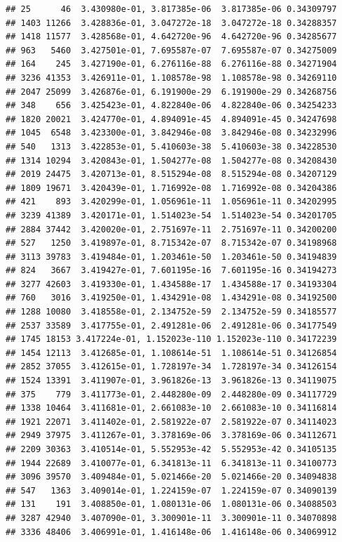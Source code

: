 \documentclass[
]{article}
\begin{document}
\begin{verbatim}
## 25      46  3.430980e-01, 3.817385e-06  3.817385e-06 0.34309797
## 1403 11266  3.428836e-01, 3.047272e-18  3.047272e-18 0.34288357
## 1418 11577  3.428568e-01, 4.642720e-96  4.642720e-96 0.34285677
## 963   5460  3.427501e-01, 7.695587e-07  7.695587e-07 0.34275009
## 164    245  3.427190e-01, 6.276116e-88  6.276116e-88 0.34271904
## 3236 41353  3.426911e-01, 1.108578e-98  1.108578e-98 0.34269110
## 2047 25099  3.426876e-01, 6.191900e-29  6.191900e-29 0.34268756
## 348    656  3.425423e-01, 4.822840e-06  4.822840e-06 0.34254233
## 1820 20021  3.424770e-01, 4.894091e-45  4.894091e-45 0.34247698
## 1045  6548  3.423300e-01, 3.842946e-08  3.842946e-08 0.34232996
## 540   1313  3.422853e-01, 5.410603e-38  5.410603e-38 0.34228530
## 1314 10294  3.420843e-01, 1.504277e-08  1.504277e-08 0.34208430
## 2019 24475  3.420713e-01, 8.515294e-08  8.515294e-08 0.34207129
## 1809 19671  3.420439e-01, 1.716992e-08  1.716992e-08 0.34204386
## 421    893  3.420299e-01, 1.056961e-11  1.056961e-11 0.34202995
## 3239 41389  3.420171e-01, 1.514023e-54  1.514023e-54 0.34201705
## 2884 37442  3.420020e-01, 2.751697e-11  2.751697e-11 0.34200200
## 527   1250  3.419897e-01, 8.715342e-07  8.715342e-07 0.34198968
## 3113 39783  3.419484e-01, 1.203461e-50  1.203461e-50 0.34194839
## 824   3667  3.419427e-01, 7.601195e-16  7.601195e-16 0.34194273
## 3277 42603  3.419330e-01, 1.434588e-17  1.434588e-17 0.34193304
## 760   3016  3.419250e-01, 1.434291e-08  1.434291e-08 0.34192500
## 1288 10080  3.418558e-01, 2.134752e-59  2.134752e-59 0.34185577
## 2537 33589  3.417755e-01, 2.491281e-06  2.491281e-06 0.34177549
## 1745 18153 3.417224e-01, 1.152023e-110 1.152023e-110 0.34172239
## 1454 12113  3.412685e-01, 1.108614e-51  1.108614e-51 0.34126854
## 2852 37055  3.412615e-01, 1.728197e-34  1.728197e-34 0.34126154
## 1524 13391  3.411907e-01, 3.961826e-13  3.961826e-13 0.34119075
## 375    779  3.411773e-01, 2.448280e-09  2.448280e-09 0.34117729
## 1338 10464  3.411681e-01, 2.661083e-10  2.661083e-10 0.34116814
## 1921 22071  3.411402e-01, 2.581922e-07  2.581922e-07 0.34114023
## 2949 37975  3.411267e-01, 3.378169e-06  3.378169e-06 0.34112671
## 2209 30363  3.410514e-01, 5.552953e-42  5.552953e-42 0.34105135
## 1944 22689  3.410077e-01, 6.341813e-11  6.341813e-11 0.34100773
## 3096 39570  3.409484e-01, 5.021466e-20  5.021466e-20 0.34094838
## 547   1363  3.409014e-01, 1.224159e-07  1.224159e-07 0.34090139
## 131    191  3.408850e-01, 1.080131e-06  1.080131e-06 0.34088503
## 3287 42940  3.407090e-01, 3.300901e-11  3.300901e-11 0.34070898
## 3336 48406  3.406991e-01, 1.416148e-06  1.416148e-06 0.34069912

\end{verbatim}
\end{document}
